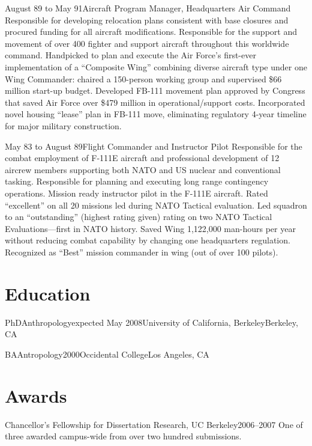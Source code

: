 \documentclass[10pt,letterpaper,lmodern]{mtvita}
\begin{document}
\begin{job}{August 89 to May 91}{Aircraft Program Manager, Headquarters Air Command}{}{%
Responsible for developing relocation plans
consistent with base closures and procured funding for all aircraft modifications. Responsible for the support and movement of over
400 fighter and support aircraft throughout this worldwide command.
}
\accomplishment Handpicked to plan and execute the Air Force's first-ever implementation of a ``Composite Wing'' combining diverse aircraft type
under one Wing Commander: chaired a 150-person working group and supervised \$66 million start-up budget.
\accomplishment Developed FB-111 movement plan approved by Congress that saved Air Force over \$479 million in operational/support costs.
\accomplishment Incorporated novel housing ``lease'' plan in FB-111 move, eliminating regulatory 4-year timeline for major military construction.
\end{job}

\begin{job}{May 83 to August 89}{Flight Commander and Instructor Pilot}{}{%
Responsible for the combat employment of F-111E aircraft and
professional development of 12 aircrew members supporting both NATO and US nuclear and conventional tasking. Responsible for
planning and executing long range contingency operations. Mission ready instructor pilot in the F-111E aircraft.
}
\accomplishment Rated ``excellent'' on all 20 missions led during NATO Tactical evaluation.
\accomplishment Led squadron to an ``outstanding'' (highest rating given) rating on two NATO Tactical Evaluations---first in NATO history.
\accomplishment Saved Wing 1,122,000 man-hours per year without reducing combat capability by changing one headquarters regulation.
\accomplishment Recognized as ``Best'' mission commander in wing (out of over 100 pilots).
\end{job}


\section{Education}

\begin{degree*}{PhD}{Anthropology}{expected May 2008}{University of California, Berkeley}{Berkeley, CA}\end{degree*}

\begin{degree*}{BA}{Antropology}{2000}{Occidental College}{Los Angeles, CA}\end{degree*}

\section{Awards}
\begin{award}{Chancellor's Fellowship for Dissertation Research, UC Berkeley}{2006--2007}%
{One of three awarded campus-wide from over two hundred submissions.}
\end{award}
\end{document}
